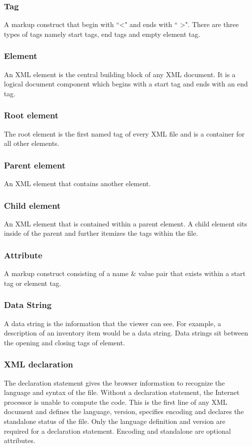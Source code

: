 \documentclass[journal]{IEEEtran}
\begin{document}
\subsubsection{Tag}
 A markup construct that begin with ``\textless" and ends with `` \textgreater ". There are three types of tags namely start tags, end tags and empty element tag.

\subsubsection{Element}
An XML element is the central building block of any XML document. It is a logical document component which begins with a start tag and ends with an end tag.

\subsubsection{Root element}
The root element is the first named tag of every XML file and is a container for all other elements.

\subsubsection{Parent element}
An XML element that contains another element.

\subsubsection{Child element}
 An XML element that is contained within a parent element. A child element sits inside of the parent and further itemizes the tags within the file.
 
 \subsubsection{Attribute}
  A markup construct consisting of a name \& value pair that exists within a start tag
or element tag.

\subsubsection{Data String}
 A data string is the information that the viewer can see. For example, a description of an inventory item would be a data string. Data strings sit between the opening and
closing tags of element.

\subsubsection{XML declaration}
The declaration statement gives the browser information to recognize
the language and syntax of the file. Without a declaration statement, the Internet processor
is unable to compute the code. This is the first line of any XML document and defines the
language, version, specifies encoding and declares the standalone status of the file. Only
the language definition and version are required for a declaration statement. Encoding and
standalone are optional attributes.
\end{document}
